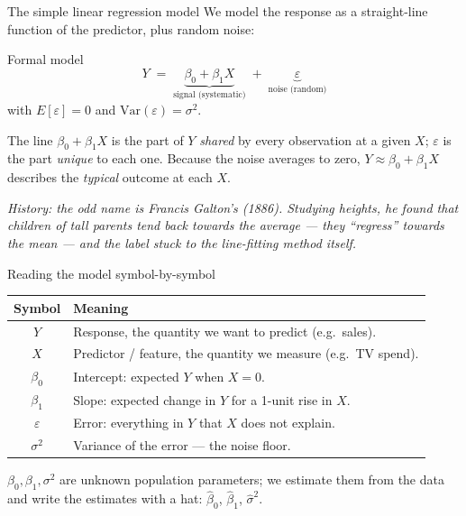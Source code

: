 \documentclass[aspectratio=169,11pt]{beamer}
\begin{document}
\begin{frame}{The simple linear regression model}
  We model the response as a straight-line function of the predictor,
  plus random noise:
  \begin{block}{Formal model}
    \[
      \boxed{\,Y \;=\; \underbrace{\beta_0 + \beta_1 X}_{\text{signal (systematic)}}
             \;+\; \underbrace{\varepsilon}_{\text{noise (random)}}\,}
    \]
    with $E[\varepsilon] = 0$ and $\mathrm{Var}(\varepsilon) = \sigma^2$.
  \end{block}
  \begin{takeaway}
    The line $\beta_0+\beta_1X$ is the part of $Y$ \emph{shared} by every
    observation at a given $X$; $\varepsilon$ is the part \emph{unique} to
    each one. Because the noise averages to zero, $Y \approx \beta_0 +
    \beta_1 X$ describes the \emph{typical} outcome at each $X$.
  \end{takeaway}
  \par{\tiny\itshape\color{gray}History: the odd name is Francis
  Galton's (1886). Studying heights, he found that children of tall parents
  tend back towards the average --- they ``regress'' towards the mean ---
  and the label stuck to the line-fitting method itself.}
\end{frame}

\begin{frame}{Reading the model symbol-by-symbol}
  \begin{readme}
    \begin{tabular}{@{}cl@{}}
      \toprule
      \textbf{Symbol} & \textbf{Meaning} \\
      \midrule
      $Y$        & Response, the quantity we want to predict (e.g.\ sales). \\
      $X$        & Predictor / feature, the quantity we measure (e.g.\ TV spend). \\
      $\beta_0$  & Intercept: expected $Y$ when $X = 0$. \\
      $\beta_1$  & Slope: expected change in $Y$ for a 1-unit rise in $X$. \\
      $\varepsilon$ & Error: everything in $Y$ that $X$ does not explain. \\
      $\sigma^2$ & Variance of the error --- the noise floor. \\
      \bottomrule
    \end{tabular}
  \end{readme}
  $\beta_0, \beta_1, \sigma^2$ are unknown population parameters; we
  estimate them from the data and write the estimates with a hat:
  $\hat\beta_0$, $\hat\beta_1$, $\hat\sigma^2$.
\end{frame}
\end{document}
